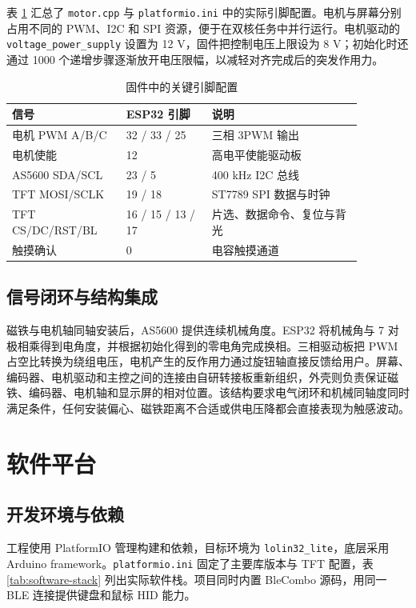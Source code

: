 表 \ref{tab:pins} 汇总了 \texttt{motor.cpp} 与 \texttt{platformio.ini} 中的实际引脚配置。电机与屏幕分别占用不同的 PWM、I2C 和 SPI 资源，便于在双核任务中并行运行。电机驱动的 \texttt{voltage\_power\_supply} 设置为 12 V，固件把控制电压上限设为 8 V；初始化时还通过 1000 个递增步骤逐渐放开电压限幅，以减轻对齐完成后的突发作用力。

\begin{table}[H]
\centering
\small
\begin{tabular}{p{0.29\linewidth}p{0.21\linewidth}p{0.37\linewidth}}
\toprule
信号 & ESP32 引脚 & 说明 \\
\midrule
电机 PWM A/B/C & 32 / 33 / 25 & 三相 3PWM 输出 \\
电机使能 & 12 & 高电平使能驱动板 \\
AS5600 SDA/SCL & 23 / 5 & 400 kHz I2C 总线 \\
TFT MOSI/SCLK & 19 / 18 & ST7789 SPI 数据与时钟 \\
TFT CS/DC/RST/BL & 16 / 15 / 13 / 17 & 片选、数据命令、复位与背光 \\
触摸确认 & 0 & 电容触摸通道 \\
\bottomrule
\end{tabular}
\caption{固件中的关键引脚配置}
\label{tab:pins}
\end{table}

\subsection{信号闭环与结构集成}

磁铁与电机轴同轴安装后，AS5600 提供连续机械角度。ESP32 将机械角与 7 对极相乘得到电角度，并根据初始化得到的零电角完成换相。三相驱动板把 PWM 占空比转换为绕组电压，电机产生的反作用力通过旋钮轴直接反馈给用户。屏幕、编码器、电机驱动和主控之间的连接由自研转接板重新组织，外壳则负责保证磁铁、编码器、电机轴和显示屏的相对位置。该结构要求电气闭环和机械同轴度同时满足条件，任何安装偏心、磁铁距离不合适或供电压降都会直接表现为触感波动。

\section{软件平台}

\subsection{开发环境与依赖}

工程使用 PlatformIO 管理构建和依赖，目标环境为 \texttt{lolin32\_lite}，底层采用 Arduino framework。\texttt{platformio.ini} 固定了主要库版本与 TFT 配置，表 \ref{tab:software-stack} 列出实际软件栈。项目同时内置 BleCombo 源码，用同一 BLE 连接提供键盘和鼠标 HID 能力。

